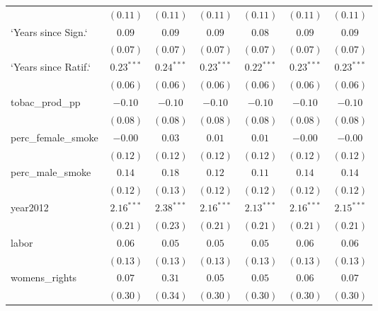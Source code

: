 \begin{table}[!h]
\begin{center}
\begin{tabular}{l c c c c c c }
                        & $(0.11)$     & $(0.11)$     & $(0.11)$     & $(0.11)$     & $(0.11)$     & $(0.11)$     \\
`Years since Sign.`     & $0.09$       & $0.09$       & $0.09$       & $0.08$       & $0.09$       & $0.09$       \\
                        & $(0.07)$     & $(0.07)$     & $(0.07)$     & $(0.07)$     & $(0.07)$     & $(0.07)$     \\
`Years since Ratif.`    & $0.23^{***}$ & $0.24^{***}$ & $0.23^{***}$ & $0.22^{***}$ & $0.23^{***}$ & $0.23^{***}$ \\
                        & $(0.06)$     & $(0.06)$     & $(0.06)$     & $(0.06)$     & $(0.06)$     & $(0.06)$     \\
tobac\_prod\_pp         & $-0.10$      & $-0.10$      & $-0.10$      & $-0.10$      & $-0.10$      & $-0.10$      \\
                        & $(0.08)$     & $(0.08)$     & $(0.08)$     & $(0.08)$     & $(0.08)$     & $(0.08)$     \\
perc\_female\_smoke     & $-0.00$      & $0.03$       & $0.01$       & $0.01$       & $-0.00$      & $-0.00$      \\
                        & $(0.12)$     & $(0.12)$     & $(0.12)$     & $(0.12)$     & $(0.12)$     & $(0.12)$     \\
perc\_male\_smoke       & $0.14$       & $0.18$       & $0.12$       & $0.11$       & $0.14$       & $0.14$       \\
                        & $(0.12)$     & $(0.13)$     & $(0.12)$     & $(0.12)$     & $(0.12)$     & $(0.12)$     \\
year2012                & $2.16^{***}$ & $2.38^{***}$ & $2.16^{***}$ & $2.13^{***}$ & $2.16^{***}$ & $2.15^{***}$ \\
                        & $(0.21)$     & $(0.23)$     & $(0.21)$     & $(0.21)$     & $(0.21)$     & $(0.21)$     \\
labor                   & $0.06$       & $0.05$       & $0.05$       & $0.05$       & $0.06$       & $0.06$       \\
                        & $(0.13)$     & $(0.13)$     & $(0.13)$     & $(0.13)$     & $(0.13)$     & $(0.13)$     \\
womens\_rights          & $0.07$       & $0.31$       & $0.05$       & $0.05$       & $0.06$       & $0.07$       \\
                        & $(0.30)$     & $(0.34)$     & $(0.30)$     & $(0.30)$     & $(0.30)$     & $(0.30)$     \\

\end{tabular}
\end{center}
\end{table}
